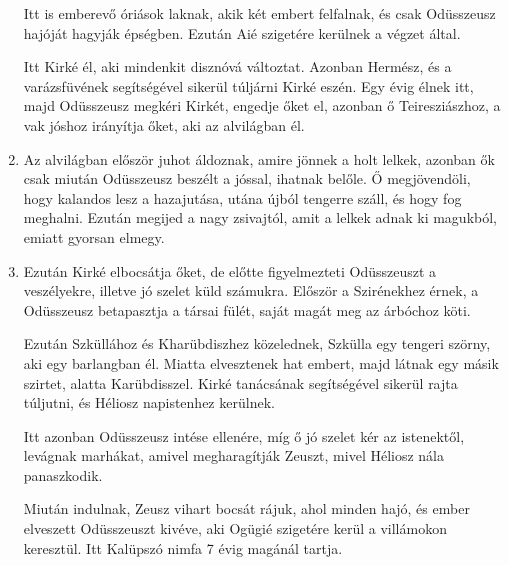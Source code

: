 \documentclass[]{article}
\begin{document}
\begin{enumerate}
				Itt is emberevő óriások laknak, akik két embert felfalnak, és csak Odüsszeusz hajóját hagyják épségben. Ezután Aié szigetére kerülnek a végzet által.
				
				Itt Kirké él, aki mindenkit disznóvá változtat. Azonban Hermész, és a varázsfüvének segítségével sikerül túljárni Kirké eszén. Egy évig élnek itt, majd Odüsszeusz megkéri Kirkét, engedje őket el, azonban ő Teiresziászhoz, a vak jóshoz irányítja őket, aki az alvilágban él.
				
				\item Az alvilágban először juhot áldoznak, amire jönnek a holt lelkek, azonban ők csak miután Odüsszeusz beszélt a jóssal, ihatnak belőle. Ő megjövendöli, hogy kalandos lesz a hazajutása, utána újból tengerre száll, és hogy fog meghalni. Ezután megijed a nagy zsivajtól, amit a lelkek adnak ki magukból, emiatt gyorsan elmegy.
				
				\item Ezután Kirké elbocsátja őket, de előtte figyelmezteti Odüsszeuszt a veszélyekre, illetve jó szelet küld számukra. Először a Szirénekhez érnek, a Odüsszeusz betapasztja a társai fülét, saját magát meg az árbóchoz köti.
				
				Ezután Szküllához és Kharübdiszhez közelednek, Szkülla egy tengeri szörny, aki egy barlangban él. Miatta elvesztenek hat embert, majd látnak egy másik szirtet, alatta Karübdisszel. Kirké tanácsának segítségével sikerül rajta túljutni, és Héliosz napistenhez kerülnek. 
				
				Itt azonban Odüsszeusz intése ellenére, míg ő jó szelet kér az istenektől, levágnak marhákat, amivel megharagítják Zeuszt, mivel Héliosz nála panaszkodik.
				
				Miután indulnak, Zeusz vihart bocsát rájuk, ahol minden hajó, és ember elveszett Odüsszeuszt kivéve, aki Ogügié szigetére kerül a villámokon keresztül. Itt Kalüpszó nimfa 7 évig magánál tartja.
			\end{enumerate}
			\cite{Odusszeia_tartalom}


\end{document}
